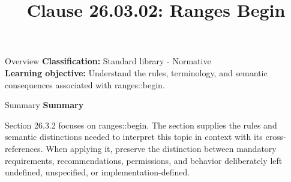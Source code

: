 \documentclass[10pt,letterpaper]{article}
\title{Clause 26.03.02: Ranges Begin}
\author{}
\date{}
\begin{document}
\maketitle
\begin{CornellOverviewBox}{Overview}
\textbf{Classification:} Standard library - Normative\\[2pt]
\textbf{Learning objective:} Understand the rules, terminology, and semantic consequences associated with ranges::begin.
\end{CornellOverviewBox}\begin{CornellSummaryBox}{Summary}
{\sffamily\bfseries\color{Accent} Summary}\par\vspace{3pt}Section 26.3.2 focuses on ranges::begin. The section supplies the rules and semantic distinctions needed to interpret this topic in context with its cross-references. When applying it, preserve the distinction between mandatory requirements, recommendations, permissions, and behavior deliberately left undefined, unspecified, or implementation-defined.
\end{CornellSummaryBox}
\end{document}
